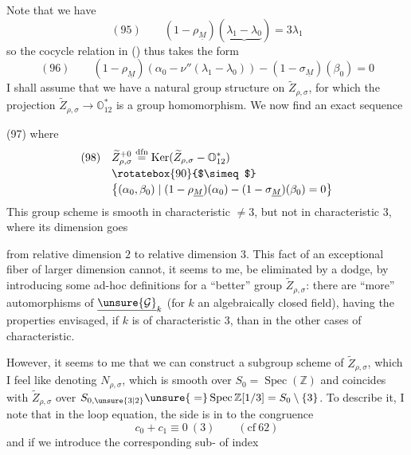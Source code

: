 Note that we have
\[
(95)\qquad (1-\rho_{\underline M})
(\underbrace{\lambda_1-\lambda_0})=3\lambda_1
\]
so the cocycle relation in ()
thus takes the form
\[
(96)\qquad
(1-\rho_{\underline M})(\alpha_0-\nu''(\lambda_1-\lambda_0))
-(1-\sigma_{\underline M})(\beta_0)=0
\]
I shall assume  that we have a natural group structure on
$\widetilde Z_{\rho,\sigma}$, for which the projection
$\widetilde Z_{\rho,\sigma}\to\mathbb O_{12}^{*}$
is a group homomorphism. We now find an exact sequence

(97)
where
\[
\begin{aligned}
(98)\quad&\widetilde Z_{\rho,\sigma}^{+0}
\overset{\mathrm{dfn}}=\operatorname{Ker}
(\widetilde Z_{\rho,\sigma}\mathbin{-}\mathbb O_{12}^{*})\\[-2pt]
&\rotatebox{90}{$\simeq$}\\[-2pt]
&\bigl\{(\alpha_0,\beta_0)\mid
(1-\rho_{\underline M})(\alpha_0)-(1-\sigma_{\underline M})(\beta_0)=0\bigr\}
\end{aligned}
\]
This group scheme is smooth in characteristic $\ne3$, but not in characteristic $3$, where its dimension goes


from relative dimension $2$ to relative dimension $3$.
This fact of an exceptional fiber of larger dimension cannot, it seems to me, be
eliminated by a dodge,  by introducing
 some ad-hoc definitions for a ``better'' group
$\widetilde Z_{\rho,\sigma}$: there are ``more'' automorphisms of
$\underline{\unsure{\mathcal G}}_k$ (for $k$ an
algebraically closed field), having the properties envisaged, if $k$ is of characteristic $3$, than in the other cases of characteristic.

However, it seems to me that we can construct a subgroup scheme
 of $\widetilde Z_{\rho,\sigma}$, which I feel like denoting
$N_{\rho,\sigma}$, which is smooth over $S_0=\operatorname{Spec}(\mathbb Z)$ and
coincides with $\widetilde Z_{\rho,\sigma}$ over
$S_{0,\unsure{3|2}}\unsure{{}=}\operatorname{Spec}\mathbb Z[1/3]=S_0\setminus\{3\}$.
To describe it, I note that in the loop equation,
the  side is
 in
to the congruence
\[
c_0+c_1\equiv0\ (3)\qquad(\mathrm{cf}\ 62)
\]
and if we introduce the corresponding sub- of index

